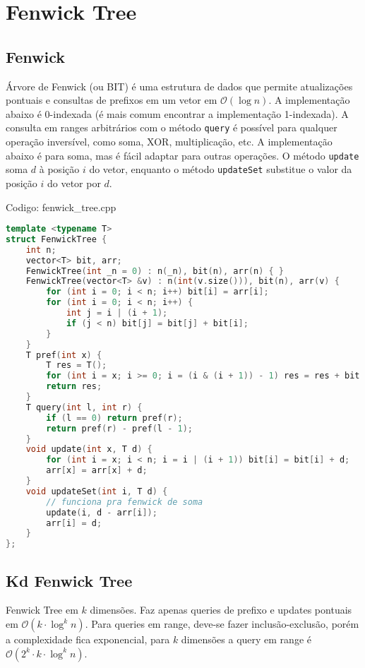 \documentclass[10pt, a4paper, oneside]{book}
\begin{document}
\section{Fenwick Tree}
\subsection{Fenwick}


Árvore de Fenwick (ou BIT) é uma estrutura de dados que permite atualizações pontuais e consultas de prefixos em um vetor em $\mathcal{O}(\log n)$. A implementação abaixo é 0-indexada (é mais comum encontrar a implementação 1-indexada). A consulta em ranges arbitrários com o método \texttt{query} é possível para qualquer operação inversível, como soma, XOR, multiplicação, etc. A implementação abaixo é para soma, mas é fácil adaptar para outras operações. O método \texttt{update} soma $d$ à posição $i$ do vetor, enquanto o método \texttt{updateSet} substitue o valor da posição $i$ do vetor por $d$.

\hfill

Codigo: fenwick\_tree.cpp

\begin{lstlisting}[language=C++]
template <typename T>
struct FenwickTree {
    int n;
    vector<T> bit, arr;
    FenwickTree(int _n = 0) : n(_n), bit(n), arr(n) { }
    FenwickTree(vector<T> &v) : n(int(v.size())), bit(n), arr(v) {
        for (int i = 0; i < n; i++) bit[i] = arr[i];
        for (int i = 0; i < n; i++) {
            int j = i | (i + 1);
            if (j < n) bit[j] = bit[j] + bit[i];
        }
    }
    T pref(int x) {
        T res = T();
        for (int i = x; i >= 0; i = (i & (i + 1)) - 1) res = res + bit[i];
        return res;
    }
    T query(int l, int r) {
        if (l == 0) return pref(r);
        return pref(r) - pref(l - 1);
    }
    void update(int x, T d) {
        for (int i = x; i < n; i = i | (i + 1)) bit[i] = bit[i] + d;
        arr[x] = arr[x] + d;
    }
    void updateSet(int i, T d) {
        // funciona pra fenwick de soma
        update(i, d - arr[i]);
        arr[i] = d;
    }
};
\end{lstlisting}
\hfill

\subsection{Kd Fenwick Tree}


Fenwick Tree em $k$ dimensões. Faz apenas queries de prefixo e updates pontuais em $\mathcal{O}(k \cdot \log^k n)$. Para queries em range, deve-se fazer inclusão-exclusão, porém a complexidade fica exponencial, para $k$ dimensões a query em range é $\mathcal{O}(2^k \cdot k \cdot \log^k n)$.
\end{document}
